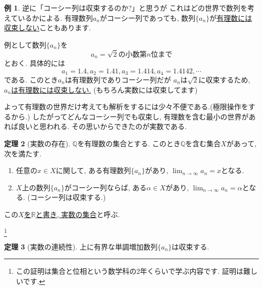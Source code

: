 \documentclass[dvipdfmx,a4paper,11pt]{article}
\newcommand{\R}{\mathbb{R}}
\newcommand{\Q}{\mathbb{Q}}
\newcommand{\N}{\mathbb{N}}
\theoremstyle{definition}
\newtheorem{thm}{定理}
\newtheorem{exa}[thm]{例}
\begin{document}
\begin{exa}
逆に「コーシー列は収束するのか?」と思うが
これはどの世界で数列を考えているかによる.
有理数列$a_n$がコーシー列であっても, 数列$\{ a_n\}$が\underline{有理数には収束しない}こともあります.

例として数列$\{ a_n\}$を
$$
a_n = \text{$\sqrt{2}$の小数第$n$位まで}
$$
とおく. 
具体的には
$$
a_1 = 1.4, a_2 = 1.41, a_3=1.414, a_4 = 1.4142, \cdots
$$
である. このとき$a_n$は有理数列でありコーシー列だが
$a_n$は$\sqrt{2}$に収束するため, 
\underline{$a_n $は有理数には収束しない.}
(もちろん実数には収束してます)
\end{exa}

よって有理数の世界だけ考えても解析をするには少々不便である.(極限操作をするから.)
したがってどんなコーシー列でも収束し, 有理数を含む最小の世界があれば良いと思われる.
その思いからできたのが実数である.

\begin{tcolorbox}[
    colback = white,
    colframe = green!35!black,
    fonttitle = \bfseries,
    breakable = true]
    \begin{thm}[実数の存在]
 $\Q$を有理数の集合とする.
このとき$\Q$を含む集合$X$があって, 次を満たす.
\begin{enumerate}
\item 任意の$x \in X$に関して, ある有理数列$\{ a_n\}$があり, $\lim_{n \rightarrow \infty} a_n = x$となる.
\item $X$上の数列$\{ a_n\}$がコーシー列ならば, ある$\alpha  \in X$があり, $\lim_{n \rightarrow \infty} a_n = \alpha$となる. (コーシー列は収束する.)
\end{enumerate}

この\underline{$X$を$\R$と書き, 実数の集合}と呼ぶ.


 \end{thm}
 \end{tcolorbox}
 \footnote{この証明は集合と位相という数学科の2年くらいで学ぶ内容です. 証明は難しいです.}


 \begin{tcolorbox}[
    colback = white,
    colframe = green!35!black,
    fonttitle = \bfseries,
    breakable = true]
    \begin{thm}[実数の連続性]
上に有界な単調増加数列$\{a_n\}$は収束する.

 \end{thm}
 \end{tcolorbox}
 
\end{document}
